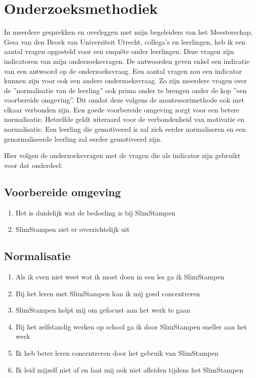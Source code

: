 \documentclass[12pt, a4paper]{article}
\begin{document}
\section{Onderzoeksmethodiek}
In meerdere gesprekken en overleggen met mijn begeleiders van het Meesterschap, Gesa van den Broek van Universiteit Utrecht, collega's en leerlingen, heb ik een aantal vragen opgesteld voor een enquête onder leerlingen. Deze vragen zijn indicatoren van mijn onderzoeksvragen. De antwoorden geven enkel een indicatie van een antwoord op de onderzoeksvraag. Een aantal vragen zou een indicator kunnen zijn voor ook een andere onderzoeksvraag. Zo zijn meerdere vragen over de ''normalisatie van de leerling'' ook prima onder te brengen onder de kop ''een voorbereide omgeving''. Dit omdat deze volgens de montessorimethode ook met elkaar verbonden zijn. Een goede voorbereide omgeving zorgt voor een betere normalisatie. Hetzelfde geldt uiteraard voor de verbondenheid van motivatie en normalisatie. Een leerling die gemotiveerd is zal zich eerder normaliseren en een genormaliseerde leerling zal eerder gemotiveerd zijn.

Hier volgen de onderzoeksvragen met de vragen die als indicator zijn gebruikt voor dat onderdeel:

\subsection*{Voorbereide omgeving}
\begin{enumerate}
    \item Het is duidelijk wat de bedoeling is bij SlimStampen
    \item SlimStampen ziet er overzichtelijk uit
\end{enumerate}
\subsection*{Normalisatie}
\begin{enumerate}
    \item Als ik even niet weet wat ik moet doen in een les ga ik SlimStampen
    \item Bij het leren met SlimStampen kan ik mij goed concentreren
    \item SlimStampen helpt mij om gefocust aan het werk te gaan
    \item Bij het zelfstandig werken op school ga ik door SlimStampen sneller aan het werk
    \item Ik heb beter leren concentreren door het gebruik van SlimStampen
    \item Ik leid mijzelf niet af en laat mij ook niet afleiden tijdens het SlimStampen
\end{enumerate}
\end{document}
